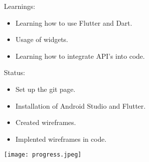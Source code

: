 \documentclass[14pt]{beamer}
\begin{document}
\begin{frame}{Learnings: }
	\begin{itemize}			
		\item Learning how to use \alert{Flutter} and \alert{Dart}.
			
		\item Usage of \alert{widgets}.

		\item Learning how to integrate API's into code.
	\end{itemize}
\end{frame}

\begin{frame}{Status: }
	\begin{itemize}
		\item Set up the \alert{git} page.

		\item Installation of \alert{Android Studio} and \alert{Flutter}.

		\item Created \alert{wireframes}.

		\item Implented wireframes in code.
	\end{itemize}
\end{frame}

\begin{frame}
	\texttt{[image: progress.jpeg]}
	\centering
\end{frame}
\end{document}
